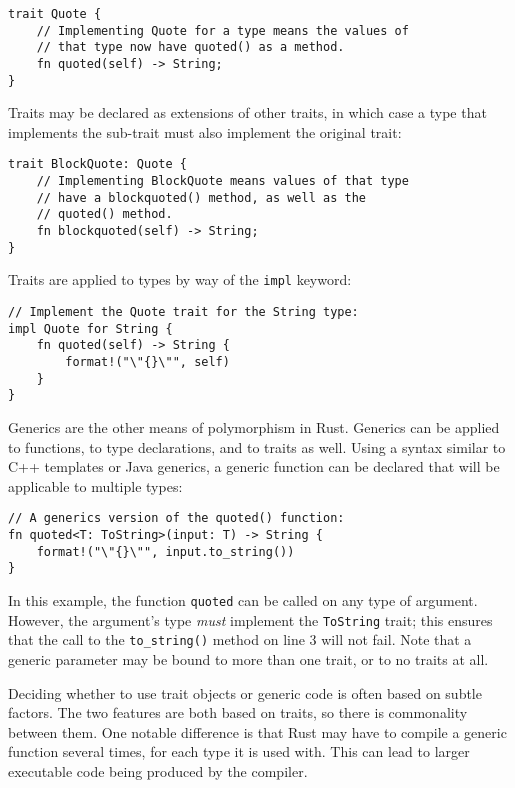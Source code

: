 \begin{lstlisting}
trait Quote {
    // Implementing Quote for a type means the values of
    // that type now have quoted() as a method.
    fn quoted(self) -> String;
}
\end{lstlisting}

Traits may be declared as extensions of other traits, in which case a type that implements the sub-trait must also implement the original trait:

\begin{lstlisting}
trait BlockQuote: Quote {
    // Implementing BlockQuote means values of that type
    // have a blockquoted() method, as well as the
    // quoted() method.
    fn blockquoted(self) -> String;
}
\end{lstlisting}

Traits are applied to types by way of the \texttt{impl} keyword:

\begin{lstlisting}
// Implement the Quote trait for the String type:
impl Quote for String {
    fn quoted(self) -> String {
        format!("\"{}\"", self)
    }
}
\end{lstlisting}

Generics are the other means of polymorphism in Rust. Generics can be applied to functions, to type declarations, and to traits as well. Using a syntax similar to C++ templates or Java generics, a generic function can be declared that will be applicable to multiple types:

\begin{lstlisting}
// A generics version of the quoted() function:
fn quoted<T: ToString>(input: T) -> String {
    format!("\"{}\"", input.to_string())
}
\end{lstlisting}

In this example, the function \texttt{quoted} can be called on any type of argument. However, the argument's type \textit{must} implement the \texttt{ToString} trait; this ensures that the call to the \texttt{to\_string()} method on line 3 will not fail. Note that a generic parameter may be bound to more than one trait, or to no traits at all.

Deciding whether to use trait objects or generic code is often based on subtle factors. The two features are both based on traits, so there is commonality between them. One notable difference is that Rust may have to compile a generic function several times, for each type it is used with. This can lead to larger executable code being produced by the compiler.

